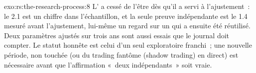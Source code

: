 \begin{solution}{exo:rs:the-research-process:8}
L' a cessé de l'être dès qu'il a servi à l'ajustement~: le 2.1 est un chiffre dans l'échantillon, et la seule preuve indépendante
est le 1.4 mesuré avant l'ajustement, lui-même un regard sur un  qui a ensuite été réutilisé. Deux paramètres ajustés sur trois ans sont aussi
essais que le journal doit compter. Le statut honnête est celui d'un seul  exploratoire franchi~; une nouvelle période, non touchée (ou du trading fantôme (shadow trading)
en direct) est nécessaire avant que l'affirmation «~deux  indépendants~» soit vraie.
\end{solution}

